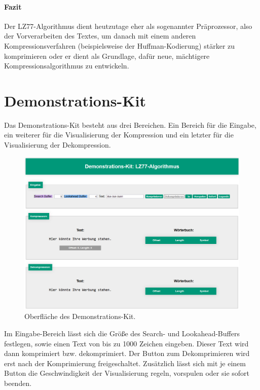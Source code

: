\documentclass[10pt, a4paper]{article}
\begin{document}
\paragraph{Fazit}
Der LZ77-Algorithmus dient heutzutage eher als sogenannter Präprozessor, also der Vorverarbeiten des Textes, um danach mit einem anderen Kompressionsverfahren (beispielsweise der Huffman-Kodierung) stärker zu komprimieren oder er dient als Grundlage, dafür neue, mächtigere Kompressionsalgorithmus zu entwickeln. \cite{website:fh-koeln,website:wikibooks,website:lz77,website:Stanford-Engineering}

\newpage
\section{Demonstrations-Kit}
Das Demonstrations-Kit besteht aus drei Bereichen. Ein Bereich für die Eingabe, ein weiterer für die Visualisierung der Kompression und ein letzter für die Visualisierung der Dekompression.

\begin{figure}[H]
    \centering
    \includegraphics[scale=0.45]{pictures/DemonstrationsKit.png}
    \caption{Oberfläche des Demonstrations-Kit.}
\end{figure}

\noindent
Im Eingabe-Bereich lässt sich die Größe des Search- und Lookahead-Buffers festlegen, sowie einen Text von bis zu 1000 Zeichen eingeben. Dieser Text wird dann komprimiert bzw. dekomprimiert. Der Button zum Dekomprimieren wird erst nach der Komprimierung freigeschaltet. Zusätzlich lässt sich mit je einem Button die Geschwindigkeit der Visualisierung regeln, vorspulen oder sie sofort beenden.
\end{document}

